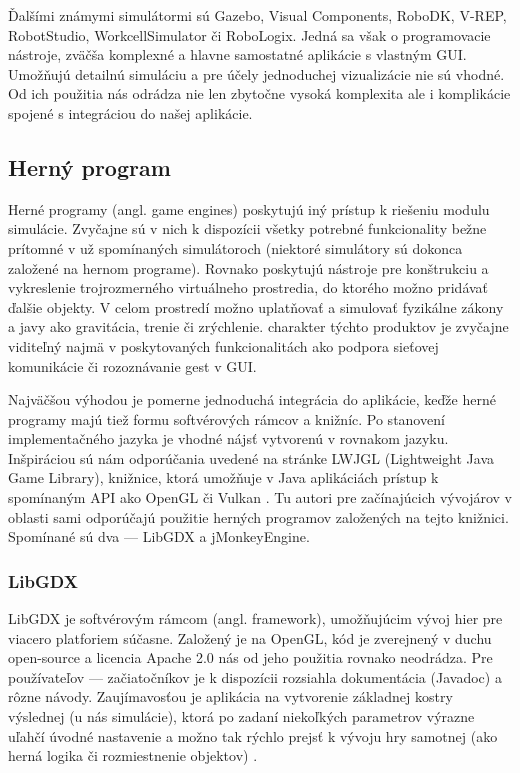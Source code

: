Ďalšími známymi simulátormi sú Gazebo, Visual Components, RoboDK, V-REP, RobotStudio, WorkcellSimulator či RoboLogix. Jedná sa však o programovacie nástroje, zväčša komplexné a hlavne samostatné aplikácie s vlastným GUI. Umožňujú detailnú simuláciu a pre účely jednoduchej vizualizácie nie sú vhodné. Od ich použitia nás odrádza nie len zbytočne vysoká komplexita ale i komplikácie spojené s integráciou do našej aplikácie.

\subsection{Herný program}
\label{sub:herny-program}
Herné programy (angl. game engines) poskytujú iný prístup k riešeniu modulu simulácie. Zvyčajne sú v nich k dispozícii všetky potrebné funkcionality bežne prítomné v už spomínaných simulátoroch (niektoré simulátory sú dokonca založené na hernom programe). Rovnako poskytujú nástroje pre konštrukciu a vykreslenie trojrozmerného virtuálneho prostredia, do ktorého možno pridávať ďalšie objekty. V celom prostredí možno uplatňovať a simulovať fyzikálne zákony a javy ako gravitácia, trenie či zrýchlenie.  charakter týchto produktov je zvyčajne viditeľný najmä v poskytovaných funkcionalitách ako podpora sieťovej komunikácie či rozoznávanie gest v GUI.

Najväčšou výhodou je pomerne jednoduchá integrácia do aplikácie, keďže herné programy majú tiež formu softvérových rámcov a knižníc. Po stanovení implementačného jazyka je vhodné nájsť  vytvorenú v rovnakom jazyku. Inšpiráciou sú nám odporúčania uvedené na stránke LWJGL (Lightweight Java Game Library), knižnice, ktorá umožňuje v Java aplikáciách prístup k spomínaným API ako OpenGL či Vulkan \cite{LWJGL}. Tu autori pre začínajúcich vývojárov v oblasti sami odporúčajú použitie herných programov založených na tejto knižnici. Spomínané sú dva --- LibGDX a jMonkeyEngine.

\subsubsection{LibGDX}
LibGDX je softvérovým rámcom (angl. framework), umožňujúcim vývoj hier pre viacero platforiem súčasne. Založený je na OpenGL, kód je zverejnený v duchu open-source a licencia Apache 2.0 nás od jeho použitia rovnako neodrádza. Pre používateľov --- začiatočníkov je k dispozícii rozsiahla dokumentácia (Javadoc) a rôzne návody. Zaujímavosťou je aplikácia na vytvorenie základnej kostry výslednej  (u nás simulácie), ktorá po zadaní niekoľkých parametrov výrazne uľahčí úvodné nastavenie a možno tak rýchlo prejsť k vývoju hry samotnej (ako herná logika či rozmiestnenie objektov) \cite{LibGDXProjectGenerator}.

